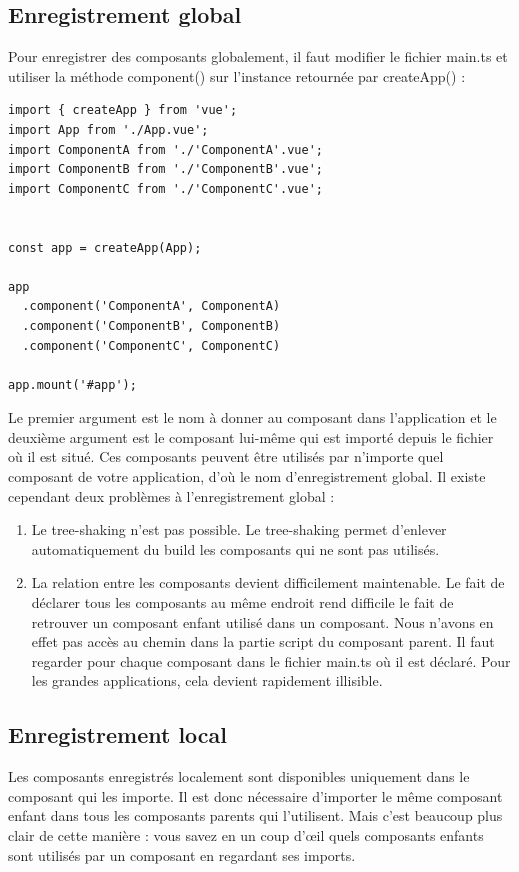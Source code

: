 \subsection{Enregistrement global}
Pour enregistrer des composants globalement, il faut modifier le fichier {\color{monOrange}main.ts} et utiliser la méthode {\color{monOrange}component()} sur l'instance retournée par {\color{monOrange}createApp()} :
\begin{verbatim}
import { createApp } from 'vue';
import App from './App.vue';
import ComponentA from './'ComponentA'.vue';
import ComponentB from './'ComponentB'.vue';
import ComponentC from './'ComponentC'.vue';


const app = createApp(App);

app
  .component('ComponentA', ComponentA)
  .component('ComponentB', ComponentB)
  .component('ComponentC', ComponentC)

app.mount('#app');
\end{verbatim}
Le premier argument est le nom à donner au composant dans l'application et le deuxième argument est le composant lui-même qui est importé depuis le fichier où il est situé. Ces composants peuvent être utilisés par n'importe quel composant de votre application, d'où le nom d'enregistrement global. Il existe cependant deux problèmes à l'enregistrement global :
\begin{enumerate}
\item  Le {\color{monOrange}tree-shaking} n'est pas possible. Le {\color{monOrange}tree-shaking} permet d'enlever automatiquement du {\color{monOrange}build} les composants qui ne sont pas utilisés.
\item La relation entre les composants devient difficilement maintenable. Le fait de déclarer tous les composants au même endroit rend difficile le fait de retrouver un composant enfant utilisé dans un composant. Nous n'avons en effet pas accès au chemin dans la partie {\color{monOrange}script} du composant parent. Il faut regarder pour chaque composant dans le fichier {\color{monOrange}main.ts} où il est déclaré. Pour les grandes applications, cela devient rapidement illisible.
\end{enumerate}
\subsection{Enregistrement local}
Les composants enregistrés localement sont disponibles uniquement dans le composant qui les importe. Il est donc nécessaire d'importer le même composant enfant dans tous les composants parents qui l'utilisent. Mais c'est beaucoup plus clair de cette manière : vous savez en un coup d'œil quels composants enfants sont utilisés par un composant en regardant ses imports.


